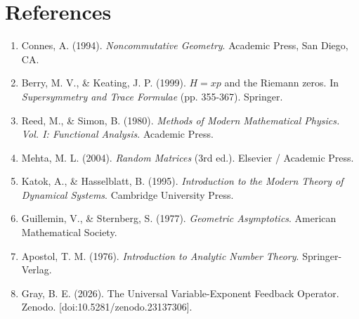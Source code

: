 \documentclass[11pt, a4paper]{article}
\begin{document}
\section{References}
\begin{enumerate}
    \item[1] Connes, A. (1994). \textit{Noncommutative Geometry}. Academic Press, San Diego, CA.
    \item[2] Berry, M. V., \& Keating, J. P. (1999). $H=xp$ and the Riemann zeros. In \textit{Supersymmetry and Trace Formulae} (pp. 355-367). Springer.
    \item[3] Reed, M., \& Simon, B. (1980). \textit{Methods of Modern Mathematical Physics. Vol. I: Functional Analysis}. Academic Press.
    \item[4] Mehta, M. L. (2004). \textit{Random Matrices} (3rd ed.). Elsevier / Academic Press.
    \item[5] Katok, A., \& Hasselblatt, B. (1995). \textit{Introduction to the Modern Theory of Dynamical Systems}. Cambridge University Press.
    \item[6] Guillemin, V., \& Sternberg, S. (1977). \textit{Geometric Asymptotics}. American Mathematical Society.
    \item[7] Apostol, T. M. (1976). \textit{Introduction to Analytic Number Theory}. Springer-Verlag.
    \item[8] Gray, B. E. (2026). The Universal Variable-Exponent Feedback Operator. Zenodo. [doi:10.5281/zenodo.23137306].
\end{enumerate}
\end{document}
